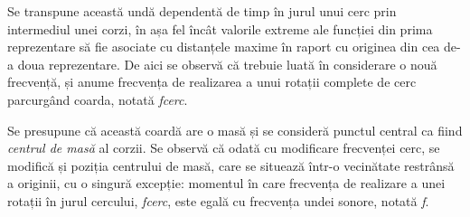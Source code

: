 \documentclass[a4paper,12pt]{report}
\begin{document}
Se transpune această undă dependentă de timp în jurul unui cerc prin intermediul unei
corzi, în așa fel încât valorile extreme ale funcției din prima reprezentare 
să fie asociate cu distanțele maxime în raport cu originea din cea de-a doua 
reprezentare. De aici se observă că trebuie luată în considerare o nouă frecvență, și anume frecvența de realizarea a unui 
rotații complete de cerc parcurgând coarda, notată \emph{fcerc}. 

Se presupune că această coardă are o masă și se consideră punctul central ca 
fiind \emph{centrul de masă} al corzii. Se observă că odată cu modificare frecvenței cerc, 
se modifică și poziția centrului de masă, care se situează într-o vecinătate restrânsă 
a originii, cu o singură excepție: momentul în care frecvența de realizare a unei rotații în jurul
cercului, \emph{fcerc}, este egală cu frecvența undei sonore, notată \emph{f}.

\end{document}

